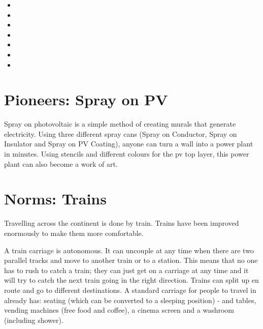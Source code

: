 \begin{pioneertalk}[title=Inshallah 2]
    \begin{itemize}
        \item {}
        \item {}
        \item {}
        \item {}
        \item {}
        \item {}
        \item {}
    \end{itemize}
\end{pioneertalk}

\section{Pioneers: Spray on PV}

Spray on photovoltaic is a simple method of creating murals that generate electricity.
Using three different spray cans (Spray on Conductor, Spray on Insulator and Spray on PV Coating), anyone can turn a wall into a power plant in minutes. Using stencils and different colours for the pv top layer, this power plant can also become a work of art.

\section{Norms: Trains}

Travelling across the continent is done by train. Trains have been improved enormously to make them more comfortable.

A train carriage is autonomous. It can uncouple at any time when there are two parallel tracks and move to another train or to a station. This means that no one has to rush to catch a train; they can just get on a carriage at any time and it will try to catch the next train going in the right direction.
Trains can split up en route and go to different destinations.
A standard carriage for people to travel in already has: seating (which can be converted to a sleeping position) - and tables, vending machines (free food and coffee), a cinema screen and a washroom (including shower).

